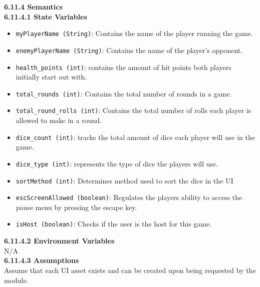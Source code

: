 \documentclass[12pt, titlepage]{article}
\begin{document}
\noindent \textbf{6.11.4 Semantics}\\
\textbf{6.11.4.1 State Variables}\\
\begin{itemize}
	\item \texttt{myPlayerName (String)}: Contains the name of the player running the game.
	\item \texttt{enemyPlayerName (String)}: Contains the name of the player's opponent.
	\item \texttt{health\_points (int)}: contains the amount of hit points both players initially start out with.
	\item \texttt{total\_rounds (int)}: Contains the total number of rounds in a game.
	\item \texttt{total\_round\_rolls (int)}: Contains the total number of rolls each player is allowed to make in a round.
	\item \texttt{dice\_count (int)}: tracks the total amount of dice each player will use in the game.
	\item \texttt{dice\_type (int)}: represents the type of dice the players will use.
	\item \texttt{sortMethod (int)}: Determines method used to sort the dice in the UI
	\item \texttt{escScreenAllowed (boolean)}: Regulates the players ability to access the pause menu by pressing the escape key.
	\item \texttt{isHost (boolean)}: Checks if the user is the host for this game.


\end{itemize}

\textbf{6.11.4.2 Environment Variables}\\

N/A\\

\textbf{6.11.4.3 Assumptions}\\
Assume that each UI asset exists and can be created upon being requested by the module. 
\end{document}
